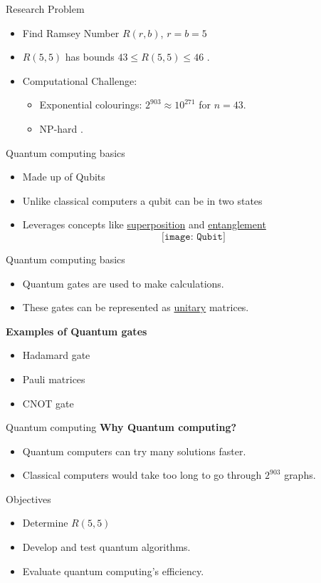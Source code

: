 \documentclass{beamer}
\begin{document}
\begin{frame}{Research Problem}
	\begin{itemize}
		\item Find Ramsey Number \( R(r,b) \), $r=b=5$
		\item \( R(5,5) \) has bounds \( 43 \leq R(5,5) \leq 46 \) \cite{Exoo1993, angeltveit2024r55le46}.
		\item Computational Challenge:
		\begin{itemize}
			\item Exponential colourings: \( 2^{903} \approx 10^{271} \) for \( n = 43 \).
			\item NP-hard \cite{burr1981generalized}.
		\end{itemize}
	\end{itemize}
\end{frame}
\begin{frame}{Quantum computing basics}
	\begin{itemize}
		\item Made up of Qubits\pause
		\item Unlike classical computers a qubit can be in two states \pause
		\item Leverages concepts like \underline{superposition} \pause and \underline{entanglement}
		$$	\texttt{[image: Qubit]}$$

		
	\end{itemize}
\end{frame}
\begin{frame}{Quantum computing basics}
	\begin{itemize}
		\item Quantum gates are used to make calculations.
		\item These gates can be represented as \underline{unitary} matrices.
	\end{itemize}
	\textbf{Examples of Quantum gates}
	\begin{itemize}
\item Hadamard gate
\item Pauli matrices
\item CNOT gate
	\end{itemize}
\end{frame}
\begin{frame}{Quantum computing}
	\textbf{Why Quantum computing?}
	\begin{itemize}
		\item Quantum computers can try many solutions faster.
		\item Classical computers would take too long to go through $ 2^{903}$ graphs.

	\end{itemize}
\end{frame}
\begin{frame}{Objectives}
	\begin{itemize}
		\item Determine \( R(5,5) \)
		\item Develop and test quantum algorithms.
		\item Evaluate quantum computing’s efficiency.
\end{itemize}
\end{frame}
\end{document}
